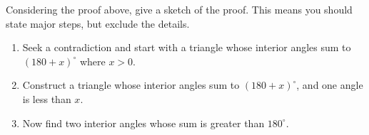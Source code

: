 \documentclass[instructornotes]{ximera}
\begin{document}
\begin{problem}
Considering the proof above, give a sketch of the proof. This means
you should state major steps, but exclude the details.

\begin{freeResponse}
  \begin{enumerate}
  \item Seek a contradiction and start with a triangle whose
    interior angles sum to $(180+x)^\circ$ where $x>0$.
  \item Construct a triangle whose interior angles sum to
    $(180+x)^\circ$, and one angle is less than $x$.
  \item Now find two interior angles whose sum is greater than
    $180^\circ$.
  \end{enumerate}
\end{freeResponse}

\end{problem}
\end{document}
